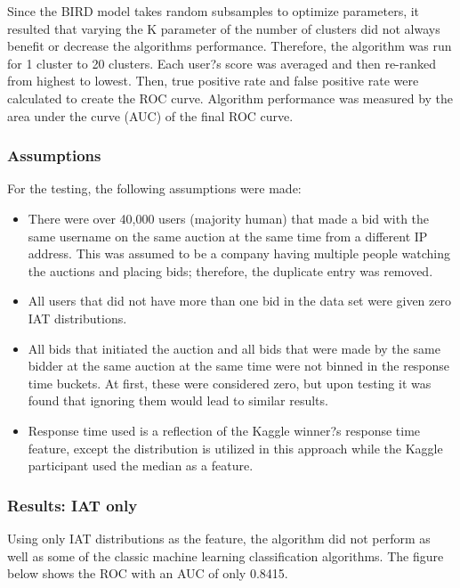 \documentclass{article} %
\begin{document}
Since the BIRD model takes random subsamples to optimize parameters, it resulted that varying the K parameter of the number of clusters did not always benefit or decrease the algorithms performance.
Therefore, the algorithm was run for 1 cluster to 20 clusters.
Each user?s score was averaged and then re-ranked from highest to lowest.
Then, true positive rate and false positive rate were calculated to create the ROC curve.
Algorithm performance was measured by the area under the curve (AUC) of the final ROC curve.

\subsubsection{Assumptions}

For the testing, the following assumptions were made:

\begin{itemize}
\item There were over 40,000 users (majority human) that made a bid with the same username on the same auction at the same time from a different IP address.
This was assumed to be a company having multiple people watching the auctions and placing bids; therefore, the duplicate entry was removed.
\item All users that did not have more than one bid in the data set were given zero IAT distributions.
\item All bids that initiated the auction and all bids that were made by the same bidder at the same auction at the same time were not binned in the response time buckets.
At first, these were considered zero, but upon testing it was found that ignoring them would lead to similar results.
\item Response time used is a reflection of the Kaggle winner?s response time feature, except the distribution is utilized in this approach while the Kaggle participant used the median as a feature.
\end{itemize}

\subsubsection{Results: IAT only}

Using only IAT distributions as the feature, the algorithm did not perform as well as some of the classic machine learning classification algorithms.
The figure below shows the ROC with an AUC of only 0.8415.
\end{document}
